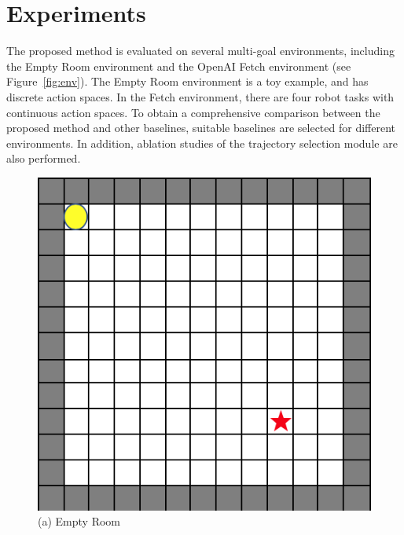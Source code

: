 \section{Experiments}
\label{sec:experiment}
The proposed method is evaluated on several multi-goal environments, including the Empty Room environment and the OpenAI Fetch environment (see Figure~\ref{fig:env}). The Empty Room environment is a toy example, and has discrete action spaces. In the Fetch environment, there are four robot tasks with continuous action spaces. To obtain a comprehensive comparison between the proposed method and other baselines, suitable baselines are selected for different environments. In addition, ablation studies of the trajectory selection module are also performed.
\begin{figure}[t]
  \centering
  \includegraphics[width=\linewidth]{figures/chapter3/empty_room.png}
  ({a}) Empty Room         
\endminipage\hfill
{}
  \centering

\end{figure}
